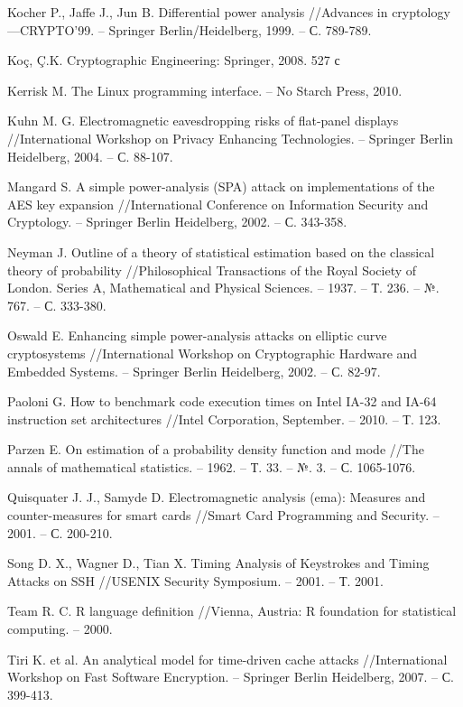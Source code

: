 \begin{thebibliography}{00}
  Kocher P., Jaffe J., Jun B. Differential power analysis //Advances in cryptology—CRYPTO’99. – Springer Berlin/Heidelberg, 1999. – С. 789-789.

  Ko{\c{c}}, \c{C}.K. Cryptographic Engineering: Springer, 2008. 527 с

  Kerrisk M. The Linux programming interface. – No Starch Press, 2010.

  Kuhn M. G. Electromagnetic eavesdropping risks of flat-panel displays //International Workshop on Privacy Enhancing Technologies. – Springer Berlin Heidelberg, 2004. – С. 88-107.

  Mangard S. A simple power-analysis (SPA) attack on implementations of the AES key expansion //International Conference on Information Security and Cryptology. – Springer Berlin Heidelberg, 2002. – С. 343-358.

  Neyman J. Outline of a theory of statistical estimation based on the classical theory of probability //Philosophical Transactions of the Royal Society of London. Series A, Mathematical and Physical Sciences. – 1937. – Т. 236. – №. 767. – С. 333-380.

  Oswald E. Enhancing simple power-analysis attacks on elliptic curve cryptosystems //International Workshop on Cryptographic Hardware and Embedded Systems. – Springer Berlin Heidelberg, 2002. – С. 82-97.

  Paoloni G. How to benchmark code execution times on Intel IA-32 and IA-64 instruction set architectures //Intel Corporation, September. – 2010. – Т. 123.

  Parzen E. On estimation of a probability density function and mode //The annals of mathematical statistics. – 1962. – Т. 33. – №. 3. – С. 1065-1076.

  Quisquater J. J., Samyde D. Electromagnetic analysis (ema): Measures and counter-measures for smart cards //Smart Card Programming and Security. – 2001. – С. 200-210.

  Song D. X., Wagner D., Tian X. Timing Analysis of Keystrokes and Timing Attacks on SSH //USENIX Security Symposium. – 2001. – Т. 2001. 

  Team R. C. R language definition //Vienna, Austria: R foundation for statistical computing. – 2000.

  Tiri K. et al. An analytical model for time-driven cache attacks //International Workshop on Fast Software Encryption. – Springer Berlin Heidelberg, 2007. – С. 399-413.


\end{thebibliography}
